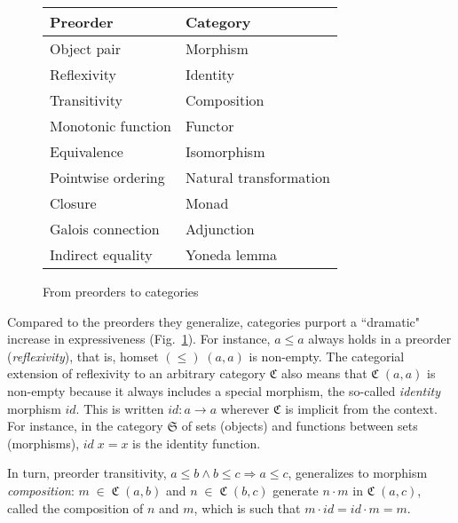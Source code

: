 \documentclass{elsarticle}
\newcommand{\Varid}[1]{\mathit{#1}}
\renewcommand{\leq}{\leqslant}
\def\comp{ \mathbin{\cdot} }
\def\cat#1{{\mathfrak #1}}
\begin{document}
\begin{figure}
\centering\footnotesize
\begin{tabular}{l|l}
\bf Preorder & \bf Category
\\\hline
   Object pair & Morphism
\\ Reflexivity & Identity
\\ Transitivity & Composition
\\ Monotonic function & Functor
\\ Equivalence & Isomorphism
\\ Pointwise ordering & Natural transformation
\\ Closure & Monad
\\ Galois connection & Adjunction
\\ Indirect equality & Yoneda lemma
\end{tabular}
\caption{From preorders to categories\label{fig:221027a}}
\end{figure}

Compared to the preorders they generalize, categories purport a ``dramatic"
increase in expressiveness (Fig.\ \ref{fig:221027a}).
For instance, \ensuremath{\Varid{a}\leq \Varid{a}} always holds in a preorder (\emph{reflexivity}), that
is, homset \ensuremath{(\leq )\;(\Varid{a},\Varid{a})} is non-empty. The categorial extension of reflexivity
to an arbitrary category \ensuremath{\cat{C}} also means that \ensuremath{\cat{C}\;(\Varid{a},\Varid{a})} is non-empty because
it always includes a special morphism, the so-called \emph{identity} morphism
\ensuremath{{id}}. This is written \ensuremath{{id}\mathbin{:}\Varid{a}\to \Varid{a}} wherever \ensuremath{\cat{C}} is implicit from the context.
For instance, in the category \ensuremath{\cat{S}} of sets (objects) and functions between sets
(morphisms), \ensuremath{{id}\;\Varid{x}\mathrel{=}\Varid{x}} is the identity function.

In turn, preorder transitivity, \ensuremath{\Varid{a}\leq \Varid{b}\mathrel{\wedge}\Varid{b}\leq \Varid{c}\Rightarrow \Varid{a}\leq \Varid{c}}, generalizes to morphism \emph{composition}:
\ensuremath{\Varid{m}\;\mathbin\in \;\cat{C}\;(\Varid{a},\Varid{b})} and \ensuremath{\Varid{n}\;\mathbin\in \;\cat{C}\;(\Varid{b},\Varid{c})} generate \ensuremath{\Varid{n} \comp \Varid{m}} in \ensuremath{\cat{C}\;(\Varid{a},\Varid{c})}, called the composition
of \ensuremath{\Varid{n}} and \ensuremath{\Varid{m}}, which is such that \ensuremath{\Varid{m} \comp {id}\mathrel{=}{id} \comp \Varid{m}\mathrel{=}\Varid{m}}.
\end{document}
